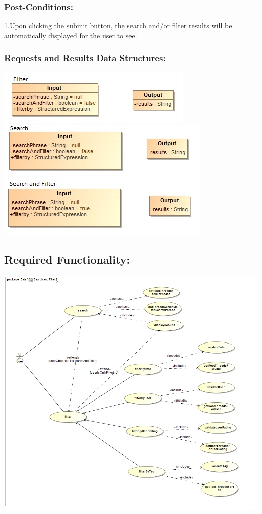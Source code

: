 \documentclass[a4paper,11pt]{article}
\begin{document}
\subsubsection*{Post-Conditions:}
1.Upon clicking the submit button, the search and/or filter results will be automatically displayed for the user to see.\\
\subsubsection*{Requests and Results Data Structures:}
\includegraphics{Images/SearchAndFilter/Filter_input_output}\\
\includegraphics{Images/SearchAndFilter/Search_Input_output}\\
\includegraphics{Images/SearchAndFilter/SearchAndFilter_input_output}\\
\subsection{Required Functionality:} 
\includegraphics{Images/SearchAndFilter/SearchAndFilter_usecase}\\
\end{document}
